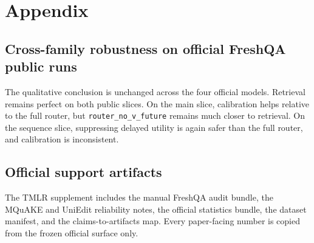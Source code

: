 \section{Appendix}

\subsection{Cross-family robustness on official FreshQA public runs}

\begin{table}[h]
\centering
\small

\caption{Official FreshQA cross-family robustness. The retrieval-dominant boundary survives the extension from the primary FLAN matrix to Qwen2.5-1.5B-Instruct and SmolLM2-360M-Instruct.}
\label{tab:appendix-public-cross-family}
\end{table}

The qualitative conclusion is unchanged across the four official models. Retrieval remains perfect on both public slices. On the main slice, calibration helps relative to the full router, but \texttt{router\_no\_v\_future} remains much closer to retrieval. On the sequence slice, suppressing delayed utility is again safer than the full router, and calibration is inconsistent.

\subsection{Official support artifacts}

The TMLR supplement includes the manual FreshQA audit bundle, the MQuAKE and UniEdit reliability notes, the official statistics bundle, the dataset manifest, and the claims-to-artifacts map. Every paper-facing number is copied from the frozen official surface only.
